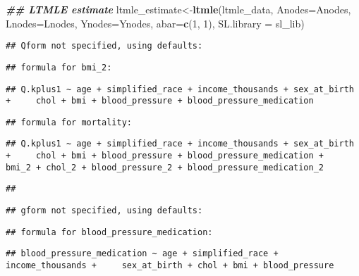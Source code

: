 \documentclass[
]{article}
\newenvironment{Shaded}{\begin{snugshade}}{\end{snugshade}}
\newcommand{\AttributeTok}[1]{\textcolor[rgb]{0.13,0.29,0.53}{#1}}
\newcommand{\DecValTok}[1]{\textcolor[rgb]{0.00,0.00,0.81}{#1}}
\newcommand{\DocumentationTok}[1]{\textcolor[rgb]{0.56,0.35,0.01}{\textbf{\textit{#1}}}}
\newcommand{\FunctionTok}[1]{\textcolor[rgb]{0.13,0.29,0.53}{\textbf{#1}}}
\newcommand{\NormalTok}[1]{#1}
\newcommand{\OtherTok}[1]{\textcolor[rgb]{0.56,0.35,0.01}{#1}}
\begin{document}
\begin{Shaded}
\begin{Highlighting}[]
\DocumentationTok{\#\# LTMLE estimate}
\NormalTok{ltmle\_estimate}\OtherTok{\textless{}{-}}\FunctionTok{ltmle}\NormalTok{(ltmle\_data, }\AttributeTok{Anodes=}\NormalTok{Anodes, }\AttributeTok{Lnodes=}\NormalTok{Lnodes, }\AttributeTok{Ynodes=}\NormalTok{Ynodes, }\AttributeTok{abar=}\FunctionTok{c}\NormalTok{(}\DecValTok{1}\NormalTok{, }\DecValTok{1}\NormalTok{), }\AttributeTok{SL.library =}\NormalTok{ sl\_lib)}
\end{Highlighting}
\end{Shaded}

\begin{verbatim}
## Qform not specified, using defaults:
\end{verbatim}

\begin{verbatim}
## formula for bmi_2:
\end{verbatim}

\begin{verbatim}
## Q.kplus1 ~ age + simplified_race + income_thousands + sex_at_birth +     chol + bmi + blood_pressure + blood_pressure_medication
\end{verbatim}

\begin{verbatim}
## formula for mortality:
\end{verbatim}

\begin{verbatim}
## Q.kplus1 ~ age + simplified_race + income_thousands + sex_at_birth +     chol + bmi + blood_pressure + blood_pressure_medication +     bmi_2 + chol_2 + blood_pressure_2 + blood_pressure_medication_2
\end{verbatim}

\begin{verbatim}
## 
\end{verbatim}

\begin{verbatim}
## gform not specified, using defaults:
\end{verbatim}

\begin{verbatim}
## formula for blood_pressure_medication:
\end{verbatim}

\begin{verbatim}
## blood_pressure_medication ~ age + simplified_race + income_thousands +     sex_at_birth + chol + bmi + blood_pressure
\end{verbatim}
\end{document}

